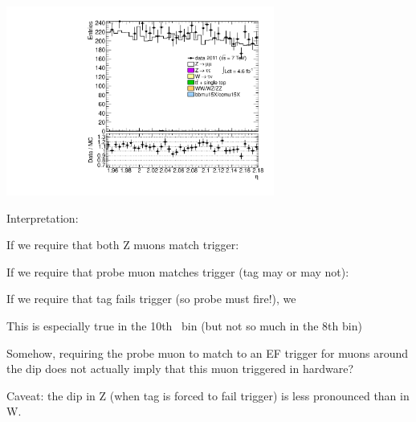 {\includegraphics[width=0.66\textwidth]{dates/20130306/figures/etaphi/Ztinv_10_A_stack_lP_eta_ALL.pdf} 
\cole
}
 {
Interpretation:
\iteb
\item If we require that both Z muons match trigger: 
\item If we require that probe muon matches trigger (tag may or may not): 
\item If we require that tag fails trigger (so probe must fire!), we 
\item This is especially true in the 10th \eta\ bin (but not so much in the 8th bin)
\iteb
\item Somehow, requiring the probe muon to match to an EF trigger for muons around the dip  does not actually imply that this muon triggered in hardware?
\item Caveat: the dip in Z (when tag is forced to fail trigger) is less pronounced than in W.
\itee
\itee
}

